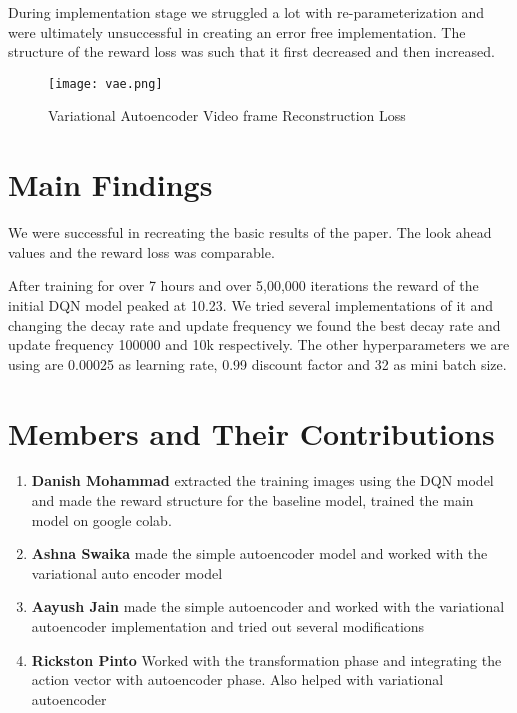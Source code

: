 \documentclass[12pt, a4paper, oneside]{report}
\begin{document}
            \par During implementation stage we struggled a lot with re-parameterization and were ultimately unsuccessful in creating an error free implementation. The structure of the reward loss was such that it first decreased and then increased.
            \begin{figure}[h]
                \centering
                \texttt{[image: vae.png]}
                \caption{Variational Autoencoder Video frame Reconstruction Loss}
            \end{figure}
    
    \chapter{Main Findings}
        \par We were successful in recreating the basic results of the paper. The look ahead values and the reward loss was comparable. 

        \par After training for over 7 hours and over 5,00,000 iterations the reward of the initial DQN model peaked at 10.23. We tried several implementations of it and changing the decay rate and update frequency we found the best decay rate and update frequency 100000 and 10k respectively. The other hyperparameters we are using are 0.00025 as learning rate,  0.99 discount factor and 32 as mini batch size.
    
    \chapter{Members and Their Contributions}
            \begin{enumerate}
                \item \textbf{Danish Mohammad} extracted the training images using the DQN model and made the reward structure for the baseline model, trained the main model on google colab.
                \item \textbf{Ashna Swaika} made the simple autoencoder model and worked with the variational auto encoder model
                \item \textbf{Aayush Jain} made the simple autoencoder and  worked with the variational autoencoder implementation and tried out several modifications
                \item \textbf{Rickston Pinto} Worked with the transformation phase and integrating the action vector with autoencoder phase. Also helped with variational autoencoder
            \end{enumerate}
\end{document}
